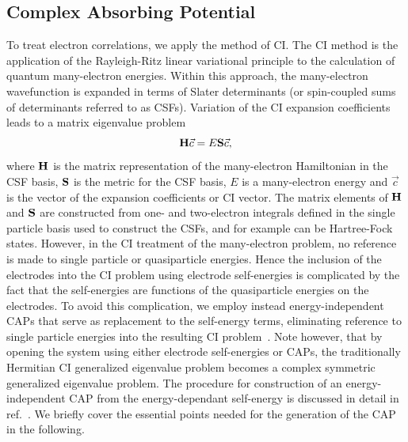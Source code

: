 
\subsection{Complex Absorbing Potential}
\label{subsec:CAP}

To treat electron correlations, we apply the method of \ac{CI}. The \ac{CI}
method is the application of the Rayleigh-Ritz linear variational principle
to the calculation of quantum many-electron energies. Within this approach,
the many-electron wavefunction is expanded in terms of Slater determinants
(or spin-coupled sums of determinants referred to as \acp{CSF}). Variation
of the \ac{CI} expansion coefficients leads to a matrix eigenvalue problem
\begin{equation}
\mathbf{H} \vec{c} = E \mathbf{S} \vec{c},
\end{equation} 
where $\mathbf{H}$ is the matrix representation of the many-electron
Hamiltonian in the CSF basis, $\mathbf{S}$ is the metric for the CSF basis,
$E$ is a many-electron energy and $\vec{c}$ is the vector of the
expansion coefficients or CI vector. The matrix elements of $\mathbf{H}$
and $\mathbf{S}$ are constructed from one- and two-electron integrals
defined in the single particle basis used to construct the CSFs, and for
example can be Hartree-Fock states. However, in the CI treatment of the
many-electron problem, no reference is made to single particle or
quasiparticle energies. Hence the inclusion of the electrodes into the
CI problem using electrode self-energies is complicated by the fact that
the self-energies are functions of the quasiparticle energies on the
electrodes. To avoid this complication, we employ instead energy-independent
\acp{CAP} that serve as replacement to the self-energy terms, eliminating
reference to single particle energies into the resulting \ac{CI}
problem~\cite{muga2004, henderson, riss_meyer}.
Note however, that by opening the system using either electrode self-energies
or \acp{CAP},  the traditionally Hermitian \ac{CI} generalized eigenvalue
problem becomes a complex symmetric generalized eigenvalue problem. The
procedure for construction of an energy-independent \ai \ac{CAP} from the
energy-dependant self-energy is discussed in detail in ref.~\cite{henderson}.
We briefly cover the essential points needed for the generation of the
\ac{CAP} in the following.

